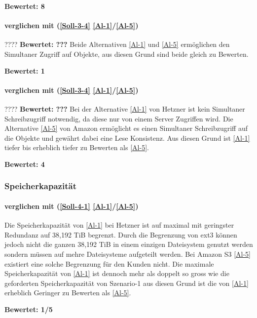 \textbf{Bewertet: 8} 


\paragraph*{  verglichen mit  (\ref{Soll-3-4} \ref{Al-1}/\ref{Al-5})}
????
\textbf{Bewertet: ???} 
Beide Alternativen \ref{Al-1} und \ref{Al-5} ermöglichen den Simultaner Zugriff auf Objekte, aus diesen Grund sind beide gleich zu Bewerten.

\textbf{Bewertet: 1} 

\paragraph*{  verglichen mit  (\ref{Soll-3-4} \ref{Al-1}/\ref{Al-5})}
????
\textbf{Bewertet: ???} 
Bei der Alternative \ref{Al-1} von Hetzner ist kein Simultaner Schreibzugriff notwendig, da diese nur von einem Server Zugriffen wird. Die Alternative \ref{Al-5} von Amazon ermöglicht es einen Simultaner Schreibzugriff auf die Objekte und gewährt dabei eine Lese Konsistenz. Aus diesen Grund ist \ref{Al-1} tiefer bis erheblich tiefer zu Bewerten als \ref{Al-5}.

\textbf{Bewertet: 4}

\subsubsection{Speicherkapazität}

\paragraph*{  verglichen mit  (\ref{Soll-4-1} \ref{Al-1}/\ref{Al-5})} 
Die Speicherkapazität von \ref{Al-1} bei Hetzner ist auf maximal mit geringster Redundanz auf 38,192 TiB begrenzt. Durch die Begrenzung von ext3 können jedoch nicht die ganzen 38,192 TiB in einem einzigen Dateisystem genutzt werden sondern müssen auf mehre Dateisysteme aufgeteilt werden. Bei Amazon S3 \ref{Al-5} existiert eine solche Begrenzung für den Kunden nicht. Die maximale Speicherkapazität von \ref{Al-1} ist dennoch mehr als doppelt so gross wie die geforderten Speicherkapazität von Szenario-1 aus diesen Grund ist die  von \ref{Al-1} erheblich Geringer zu Bewerten als \ref{Al-5}.

\textbf{Bewertet: 1/5}

